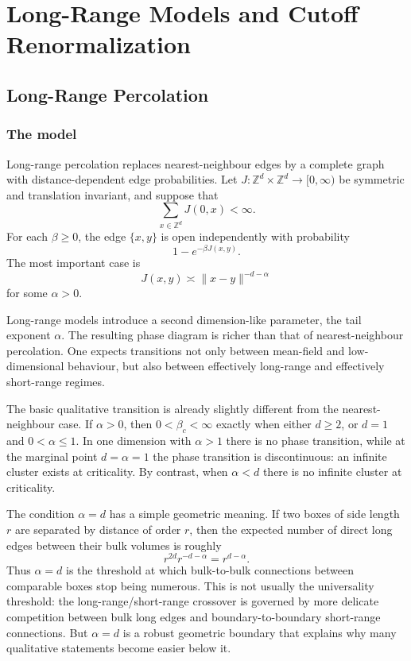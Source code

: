 \documentclass[11pt,reqno]{book}
\numberwithin{equation}{chapter}
\theoremstyle{plain}
\theoremstyle{definition}
\theoremstyle{remark}
\newcommand{\Z}{\mathbb Z}
\newcommand{\1}{\mathbf 1}
\newcommand{\norm}[1]{\lVert #1\rVert}
\newcommand{\as}{\asymp}
\begin{document}
\part{Long-Range Models and Cutoff Renormalization}

\chapter{Long-Range Percolation}

\section{The model}

Long-range percolation replaces nearest-neighbour edges by a complete graph with distance-dependent edge probabilities. Let $J:\Z^d\times\Z^d\to[0,\infty)$ be symmetric and translation invariant, and suppose that
\[
  \sum_{x\in\Z^d} J(0,x)<\infty.
\]
For each $\beta\geq 0$, the edge $\{x,y\}$ is open independently with probability
\[
  1-e^{-\beta J(x,y)}.
\]
The most important case is
\[
  J(x,y)\as \norm{x-y}^{-d-\alpha}
\]
for some $\alpha>0$.

Long-range models introduce a second dimension-like parameter, the tail exponent $\alpha$. The resulting phase diagram is richer than that of nearest-neighbour percolation. One expects transitions not only between mean-field and low-dimensional behaviour, but also between effectively long-range and effectively short-range regimes.

The basic qualitative transition is already slightly different from the nearest-neighbour case. If $\alpha>0$, then $0<\beta_c<\infty$ exactly when either $d\geq2$, or $d=1$ and $0<\alpha\leq1$. In one dimension with $\alpha>1$ there is no phase transition, while at the marginal point $d=\alpha=1$ the phase transition is discontinuous: an infinite cluster exists at criticality. By contrast, when $\alpha<d$ there is no infinite cluster at criticality.

The condition $\alpha=d$ has a simple geometric meaning. If two boxes of side length $r$ are separated by distance of order $r$, then the expected number of direct long edges between their bulk volumes is roughly
\[
  r^{2d}r^{-d-\alpha}=r^{d-\alpha}.
\]
Thus $\alpha=d$ is the threshold at which bulk-to-bulk connections between comparable boxes stop being numerous. This is not usually the universality threshold: the long-range/short-range crossover is governed by more delicate competition between bulk long edges and boundary-to-boundary short-range connections. But $\alpha=d$ is a robust geometric boundary that explains why many qualitative statements become easier below it.
\end{document}
